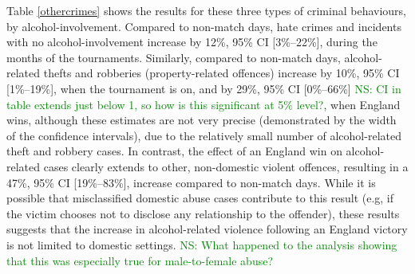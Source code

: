 \documentclass[12pt, a4paper]{article}
\newcommand{\NS}[1]{\textcolor{green}{NS: #1}}
\begin{document}
Table \ref{othercrimes} shows the results for these three types of criminal behaviours, by alcohol-involvement. Compared to non-match days, hate crimes and incidents with no alcohol-involvement increase by 12\%, 95\% CI [3\%--22\%], during the months of the tournaments. Similarly, compared to non-match days, alcohol-related thefts and robberies (property-related offences) increase by 10\%, 95\% CI [1\%--19\%], when the tournament is on, and by 29\%, 95\% CI [0\%--66\%] \NS{CI in table extends just below 1, so how is this significant at 5\% level?}, when England wins, although these estimates are not very precise (demonstrated by the width of the confidence intervals), due to the relatively small number of alcohol-related theft and robbery cases. In contrast, the effect of an England win on alcohol-related cases clearly extends to other, non-domestic violent offences, resulting in a 47\%, 95\% CI [19\%--83\%], increase compared to non-match days. While it is possible that misclassified domestic abuse cases contribute to this result (e.g, if the victim chooses not to disclose any relationship to the offender), these results suggests that the increase in alcohol-related violence following an England victory is not limited to domestic settings. \NS{What happened to the analysis showing that this was especially true for male-to-female abuse?}
\end{document}
